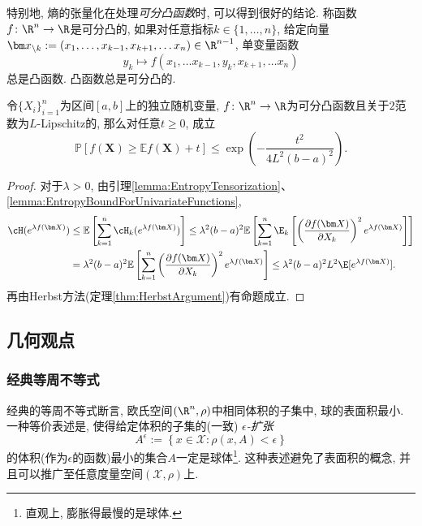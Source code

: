 特别地, 熵的张量化在处理\emph{可分凸函数}时, 可以得到很好的结论. 
称函数$f \colon \R^n \to \R$是可分凸的, 如果对任意指标$k \in \{1, \dots, n\}$, 给定向量$\bm x_{\backslash k} := (x_1, \dots, x_{k-1}, x_{k+1}, \dots x_n) \in \R^{n-1}$, 单变量函数
\begin{equation*}
	y_k \mapsto f(x_1, \dots x_{k-1}, y_k, x_{k+1}, \dots x_n)
\end{equation*}
总是凸函数. 
凸函数总是可分凸的. 

\begin{proposition}
	令$\{X_i\}_{i=1}^n$为区间$[a, b]$上的独立随机变量, $f \colon \R^n \to \R$为可分凸函数且关于$2$范数为$L$-Lipschitz的, 那么对任意$t \geq 0$, 成立
	\begin{equation*}
		\mathbb{P}[f(\bm X) \geq \mathbb{E}f(\bm X) + t] 
		\leq \exp \left( - \frac{t^2}{4L^2 (b-a)^2} \right). 
	\end{equation*}	
\end{proposition}
\begin{proof}
	对于$\lambda > 0$, 由引理\ref{lemma:EntropyTensorization}、 \ref{lemma:EntropyBoundForUnivariateFunctions}, 
	\begin{align*}
		\cH(e^{\lambda f(\bm X)})
		&\leq \mathbb{E}\left[ \sum_{k=1}^n \cH_k (e^{\lambda f(\bm X)}) \right]
		\leq \lambda^2 (b-a)^2  \mathbb{E}\left[ \sum_{k=1}^n \E_k\left[ \left(\frac{\partial f(\bm X)}{\partial X_k} \right)^2 e^{\lambda f(\bm X)}\right] \right] \\
		&= \lambda^2 (b-a)^2  \mathbb{E}\left[ \sum_{k=1}^n \left(\frac{\partial f(\bm X)}{\partial X_k} \right)^2 e^{\lambda f(\bm X)}\right]
		\leq \lambda^2 (b-a)^2 L^2 \E[e^{\lambda f(\bm X)}]. 
	\end{align*}
	再由Herbst方法(定理\ref{thm:HerbstArgument})有命题成立. 
\end{proof}



\subsection{几何观点}

\subsubsection{经典等周不等式}

经典的等周不等式断言, 欧氏空间$(\R^n, \rho)$中相同体积的子集中, 球的表面积最小. 
一种等价表述是, 使得给定体积的子集的(一致) \emph{$\epsilon$-扩张}
\begin{equation*}
	A^{\epsilon} := \left\{ x \in \mathcal{X} \colon \rho(x, A) < \epsilon \right\}
\end{equation*}
的体积(作为$\epsilon$的函数)最小的集合$A$一定是球体\footnote{直观上, 膨胀得最慢的是球体.}.  
这种表述避免了表面积的概念, 并且可以推广至任意度量空间$(\mathcal{X}, \rho)$上. 

